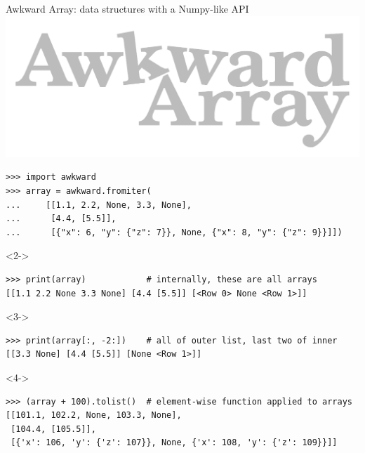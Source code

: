\documentclass[aspectratio=169]{beamer}
\begin{document}
\begin{frame}[fragile]{Awkward Array: data structures with a Numpy-like API}
\small
\hfill\includegraphics[height=2 cm]{awkward-logo.pdf}

\vspace{-2 cm}
\begin{verbatim}
>>> import awkward
>>> array = awkward.fromiter(
...     [[1.1, 2.2, None, 3.3, None],
...      [4.4, [5.5]],
...      [{"x": 6, "y": {"z": 7}}, None, {"x": 8, "y": {"z": 9}}]])
\end{verbatim}

\begin{uncoverenv}<2->
\begin{verbatim}
>>> print(array)            # internally, these are all arrays
[[1.1 2.2 None 3.3 None] [4.4 [5.5]] [<Row 0> None <Row 1>]]
\end{verbatim}
\end{uncoverenv}

\begin{uncoverenv}<3->
\begin{verbatim}
>>> print(array[:, -2:])    # all of outer list, last two of inner
[[3.3 None] [4.4 [5.5]] [None <Row 1>]]
\end{verbatim}
\end{uncoverenv}

\begin{uncoverenv}<4->
\begin{verbatim}
>>> (array + 100).tolist()  # element-wise function applied to arrays
[[101.1, 102.2, None, 103.3, None],
 [104.4, [105.5]],
 [{'x': 106, 'y': {'z': 107}}, None, {'x': 108, 'y': {'z': 109}}]]
\end{verbatim}
\end{uncoverenv}
\end{frame}
\end{document}
